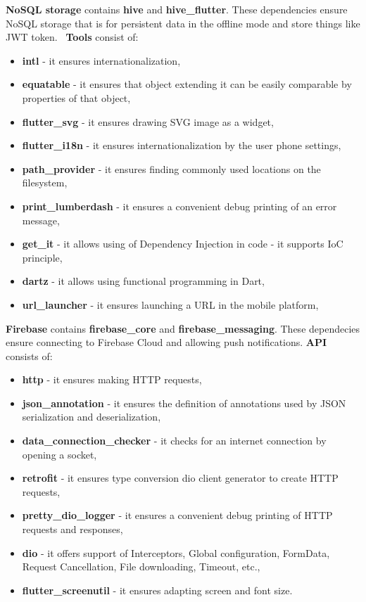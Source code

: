 \textbf{NoSQL storage} contains \textbf{hive} and \textbf{hive\_flutter}.
These dependencies ensure NoSQL storage that is for persistent data in the offline mode and store things like JWT token.~\cite{jwtToken}
\newline
\newline
\textbf{Tools} consist of:
\begin{itemize}
    \item \textbf{intl} - it ensures internationalization,
    \item \textbf{equatable} - it ensures that object extending it can be easily comparable by properties of that object,
    \item \textbf{flutter\_svg} - it ensures drawing SVG image as a widget,
    \item \textbf{flutter\_i18n} - it ensures internationalization by the user phone settings,
    \item \textbf{path\_provider} - it ensures finding commonly used locations on the filesystem,
    \item \textbf{print\_lumberdash} - it ensures a convenient debug printing of an error message,
    \item \textbf{get\_it} - it allows using of Dependency Injection in code - it supports IoC principle,~\cite{iocPrinciple}
    \item \textbf{dartz} - it allows using functional programming in Dart,
    \item \textbf{url\_launcher} - it ensures launching a URL in the mobile platform,
\end{itemize}
\textbf{Firebase} contains \textbf{firebase\_core} and \textbf{firebase\_messaging}.
These dependecies ensure connecting to Firebase Cloud and allowing push notifications.
\newline
\textbf{API} consists of:
\begin{itemize}
    \item \textbf{http} - it ensures making HTTP requests,
    \item \textbf{json\_annotation} - it ensures the definition of annotations used by JSON serialization and deserialization,
    \item \textbf{data\_connection\_checker} - it checks for an internet connection by opening a socket,
    \item \textbf{retrofit} - it ensures type conversion dio client generator to create HTTP requests,
    \item \textbf{pretty\_dio\_logger} - it ensures a convenient debug printing of HTTP requests and responses,
    \item \textbf{dio} - it offers support of Interceptors, Global configuration, FormData, Request Cancellation, File downloading, Timeout, etc.,
    \item \textbf{flutter\_screenutil} - it ensures adapting screen and font size.
\end{itemize}
